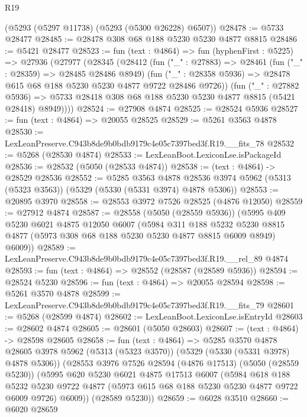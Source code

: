 \begin{lexlean}{R19}
\begin{coremodule}
    (@5293 (@5297 @11738) (@5293 (@5300 @26228) @6507))
@28478 := @5733 @28477
@28485 := @28478 @308 @68 @188 @5230 @5230 @4877 @8815
@28486 := @5421 @28477
@28523 := fun (text : @4864) =>
  fun (hyphenFirst : @5225) =>
  @27936
    (@27977
      (@28345
        (@28412
          (fun ("_" : @27883) =>
          @28461
            (fun ("_" : @28359) => @28485 @28486 @8949)
            (fun ("_" : @28358 @5936) => @28478 @615 @68 @188 @5230 @5230 @4877 @9722 @28486 @9726))
          (fun ("_" : @27882 @5936) =>
          @5733 @28418 @308 @68 @188 @5230 @5230 @4877 @8815 (@5421 @28418) @8949))))
@28524 := @27908 @4874
@28525 := @28524 @5936
@28527 := fun (text : @4864) => @20055 @28525
@28529 := @5261 @3563 @4878
@28530 := LexLeanPreserve.C943b8de9b0bdb9179c4e05c7397bed3f.R19.__fits_78
@28532 := @5268 (@28530 @4874)
@28533 := LexLeanBoot.LexiconLse.isPackageId
@28536 := @28532 (@5050 (@28533 @4874))
@28538 := (text : @4864) -> @28529 @28536
@28552 := @5285
    @3563
    @4878
    @28536
    @3974
    @5962
    (@5313 (@5323 @3563))
    (@5329 (@5330 (@5331 @3974) @4878 @5306))
@28553 := @20895 @3970
@28558 := @28553 @3972 @7526 @28525 (@4876 @12050)
@28559 := @27912 @4874
@28587 := @28558
    (@5050 (@28559 @5936))
    (@5995
      @409
      @5230
      @6021
      @4875
      @12050
      @6007
      (@5984
        @311
        @188
        @5232
        @5230
        @8815
        @4877
        (@5973 @308 @68 @188 @5230 @5230 @4877 @8815 @6009 @8949)
        @6009))
@28589 := LexLeanPreserve.C943b8de9b0bdb9179c4e05c7397bed3f.R19.__rel_89 @4874
@28593 := fun (text : @4864) => @28552 (@28587 (@28589 @5936))
@28594 := @28524 @5230
@28596 := fun (text : @4864) => @20055 @28594
@28598 := @5261 @3570 @4878
@28599 := LexLeanPreserve.C943b8de9b0bdb9179c4e05c7397bed3f.R19.__fits_79
@28601 := @5268 (@28599 @4874)
@28602 := LexLeanBoot.LexiconLse.isEntryId
@28603 := @28602 @4874
@28605 := @28601 (@5050 @28603)
@28607 := (text : @4864) -> @28598 @28605
@28658 := fun (text : @4864) =>
  @5285
    @3570
    @4878
    @28605
    @3978
    @5962
    (@5313 (@5323 @3570))
    (@5329 (@5330 (@5331 @3978) @4878 @5306))
    (@28553
      @3976
      @7526
      @28594
      (@4876 @17513)
      (@5050 (@28559 @5230))
      (@5995
        @620
        @5230
        @6021
        @4875
        @17513
        @6007
        (@5984
          @618
          @188
          @5232
          @5230
          @9722
          @4877
          (@5973 @615 @68 @188 @5230 @5230 @4877 @9722 @6009 @9726)
          @6009))
      (@28589 @5230))
@28659 := @6028 @3510
@28660 := @6020 @28659

\end{coremodule}
\end{lexlean}
